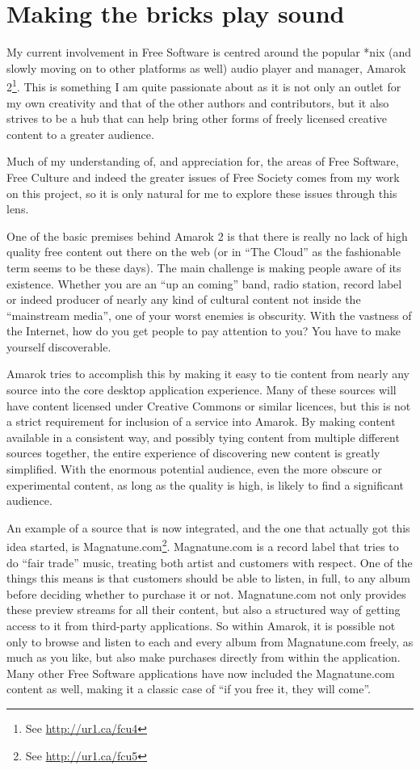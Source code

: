 \section{Making the bricks play sound}
\label{s:consumer_to_creator:play_sound}

My current involvement in Free Software is centred around the popular *nix (and
slowly moving on to other platforms as well) audio player and manager, Amarok
2\footnote{See \url{http://ur1.ca/fcu4}}. This is something I am quite passionate
about as it is not only an outlet for my own creativity and that of the other
authors and contributors, but it also strives to be a hub that can help bring
other forms of freely licensed creative content to a greater audience.

Much of my understanding of, and appreciation for, the areas of Free Software,
Free Culture and indeed the greater issues of Free Society comes from my work on
this project, so it is only natural for me to explore these issues through this
lens.

One of the basic premises behind Amarok 2 is that there is really no lack of
high quality free content out there on the web (or in ``The Cloud'' as the
fashionable term seems to be these days). The main challenge is making people
aware of its existence. Whether you are an ``up an coming'' band, radio station,
record label or indeed producer of nearly any kind of cultural content not
inside the ``mainstream media'', one of your worst enemies is obscurity. With
the vastness of the Internet, how do you get people to pay attention to you? You
have to make yourself discoverable.

Amarok tries to accomplish this by making it easy to tie content from nearly any
source into the core desktop application experience. Many of these sources will
have content licensed under Creative Commons or similar licences, but this is
not a strict requirement for inclusion of a service into Amarok. By making
content available in a consistent way, and possibly tying content from multiple
dif\hbox{}ferent sources together, the entire experience of discovering new
content is greatly simplif\hbox{}ied. With the enormous potential audience, even
the more obscure or experimental content, as long as the quality is high, is
likely to f\hbox{}ind a signif\hbox{}icant audience.

An example of a source that is now integrated, and the one that actually got
this idea started, is Magnatune.com\footnote{See \url{http://ur1.ca/fcu5}}.
Magnatune.com is a record label that tries to do ``fair trade'' music, treating
both artist and customers with respect. One of the things this means is that
customers should be able to listen, in full, to any album before deciding
whether to purchase it or not. Magnatune.com not only provides these preview
streams for all their content, but also a structured way of getting access to it
from third-party applications. So within Amarok, it is possible not only to
browse and listen to each and every album from Magnatune.com freely, as much as
you like, but also make purchases directly from within the application. Many
other Free Software applications have now included the Magnatune.com content as
well, making it a classic case of ``if you free it, they will come''.


